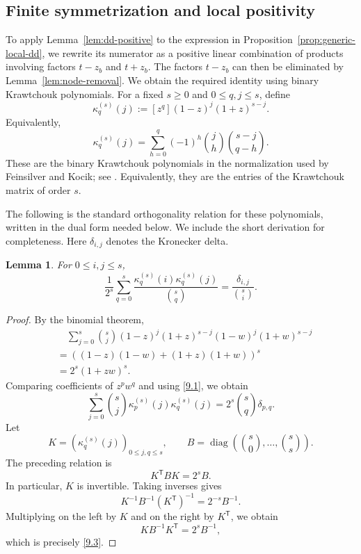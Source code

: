 \documentclass[12pt]{amsart}
\newtheorem{Lemma}[Theorem]{Lemma}
\theoremstyle{definition}
\begin{document}
\subsection{Finite symmetrization and local positivity}\label{sec:local-positive}

To apply Lemma~\ref{lem:dd-positive} to the expression in
Proposition~\ref{prop:generic-local-dd}, we rewrite its numerator as
a positive linear combination of products involving factors
$t-z_b$ and $t+z_b$.
The factors $t-z_b$ can then be eliminated by
Lemma~\ref{lem:node-removal}.
We obtain the required identity using binary Krawtchouk polynomials. For a fixed $s\ge0$
and $0\le q,j\le s$, define
\begin{equation}\label{9.1}
\kappa_q^{(s)}(j)
:=[z^q](1-z)^j(1+z)^{s-j}.
\end{equation}
Equivalently,
\begin{equation}\label{9.2}
\kappa_q^{(s)}(j)
=
\sum_{h=0}^q
(-1)^h\binom{j}{h}\binom{s-j}{q-h}.
\end{equation}
These are the binary Krawtchouk polynomials in the normalization used by
Feinsilver and Kocik; see \cite{FeinsilverKocik}.  Equivalently, they are
the entries of the Krawtchouk matrix of order $s$. 

The following is the standard orthogonality relation for these
polynomials, written in the dual form needed below.  We include the short
derivation for completeness.  Here $\delta_{i,j}$ denotes the Kronecker
delta.

\begin{Lemma}\label{lem:kappa-orthogonality} 
For $0\le i,j\le s$, 
\begin{equation}\label{9.3}
\frac{1}{2^s}
\sum_{q=0}^s 
\frac{\kappa_q^{(s)}(i)\kappa_q^{(s)}(j)} {\binom{s}{q}} = \frac{\delta_{i,j}}{\binom{s}{i}}. 
\end{equation} 
\end{Lemma}

\begin{proof}
By the binomial theorem,
\[
\begin{aligned}
 &\quad \sum_{j=0}^s\binom{s}{j}
(1-z)^j(1+z)^{s-j}
(1-w)^j(1+w)^{s-j}\\
& =
\left((1-z)(1-w)+(1+z)(1+w)\right)^s\\
& =
2^s(1+zw)^s.
\end{aligned}
\]
Comparing coefficients of $z^pw^q$ and using \eqref{9.1}, we obtain
\[ 
\sum_{j=0}^s
\binom{s}{j}
\kappa_p^{(s)}(j)\kappa_q^{(s)}(j)
=
2^s\binom{s}{q}\delta_{p,q}.
\]
Let
\[
K=(\kappa_q^{(s)}(j))_{0\le j,q\le s},
\qquad
B=\operatorname{diag}\!\left(
\binom{s}{0},\ldots,\binom{s}{s}
\right).
\]
The preceding relation is
\[
K^{\mathsf T}BK=2^sB.
\]
In particular, $K$ is invertible.  Taking inverses gives
\[
K^{-1}B^{-1}(K^{\mathsf T})^{-1}=2^{-s}B^{-1}.
\]
Multiplying on the left by $K$ and on the right by $K^{\mathsf T}$, we
obtain
\[
KB^{-1}K^{\mathsf T}=2^sB^{-1},
\]
which is precisely \eqref{9.3}.
\end{proof}
\end{document}
